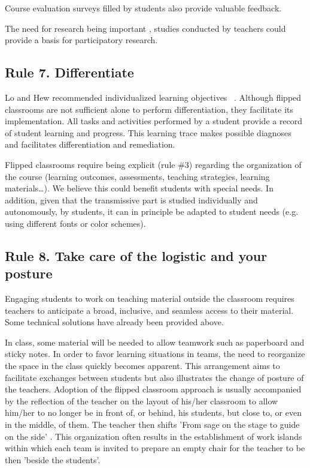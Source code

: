 \documentclass[10pt,letterpaper]{article}
\begin{document}
Course evaluation surveys filled by students also provide valuable feedback.

The need for research being important \cite{abeysekera_motivation_2015,bishop_flipped_2013,lo_critical_2017}, studies conducted 
by teachers could provide a basis for participatory research.

\subsection{Rule 7. Differentiate}

Lo and Hew recommended individualized learning objectives ~\cite{lo_critical_2017}. Although flipped classrooms are not sufficient
alone to perform differentiation, they facilitate its implementation. All tasks and activities performed by a student provide a record
of student learning and progress. This learning trace makes possible diagnoses and facilitates differentiation and remediation.

Flipped classrooms require being explicit (rule \#3) regarding the organization of the course (learning outcomes, assessments, 
teaching strategies, learning materials\ldots). We believe this could benefit students with special needs. 
In addition, given that the transmissive part is studied individually and autonomously, by students, 
it can in principle be adapted to student needs (e.g. using different fonts or color schemes).


\subsection{Rule 8. Take care of the logistic and your posture}

Engaging students to work on teaching material outside the classroom requires teachers to anticipate a broad, inclusive, 
and seamless access to their material. Some technical solutions have already been provided above.

In class, some material will be needed to allow teamwork such as paperboard and sticky notes. 
In order to favor learning situations in teams, the need to reorganize the space in the class
quickly becomes apparent. 
This arrangement aims to facilitate exchanges between students but also illustrates the change of posture of the teachers. 
Adoption of the flipped classroom approach is usually accompanied by the reflection of the teacher on the layout of his/her
classroom to allow him/her to no longer be in front of, or behind, his students, but close to, or even in the middle, of them. 
The teacher then shifts 'From sage on the stage to guide on the side' \cite{king_sage_1993}. 
This organization often results in the establishment of work islands within which each team is invited to prepare 
an empty chair for the teacher to be then 'beside the students'.
\end{document}
